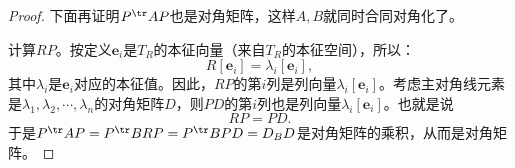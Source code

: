 \documentclass[12pt,UTF8,fontset=none]{ctexbook}
\begin{document}
\begin{appendix}
\begin{proof}
    下面再证明$P^{\tr}AP$也是对角矩阵，这样$A,B$就同时合同对角化了。

    计算$RP$。按定义$\mathbf{e}_i$是$T_R$的本征向量（来自$T_R$的本征空间），所以：
    $$ R[\mathbf{e}_i] = \lambda_i [\mathbf{e}_i],$$
    其中$\lambda_i$是$\mathbf{e}_i$对应的本征值。因此，$RP$的第$i$列是列向量$\lambda_i [\mathbf{e}_i]$。考虑主对角线元素是$\lambda_1,\lambda_2, \cdots, \lambda_n$的对角矩阵$D$，则$PD$的第$i$列也是列向量$\lambda_i [\mathbf{e}_i]$。也就是说
    $$ RP = PD. $$
    于是$ P^{\tr}AP = P^{\tr}BRP = P^{\tr}BPD = D_BD$是对角矩阵的乘积，从而是对角矩阵。
\end{proof}

\end{appendix}

\end{document}
